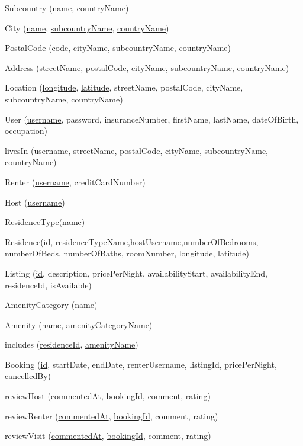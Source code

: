 \documentclass[11pt]{article}
\begin{document}
Subcountry (\underline{name}, \underline{countryName})

City (\underline{name}, \underline{subcountryName}, \underline{countryName})

PostalCode (\underline{code}, \underline{cityName}, \underline{subcountryName}, \underline{countryName})

Address (\underline{streetName}, \underline{postalCode}, \underline{cityName}, \underline{subcountryName}, \underline{countryName})

Location (\underline{longitude}, \underline{latitude}, streetName, postalCode, cityName, subcountryName, countryName)

User (\underline{username}, password, insuranceNumber, firstName, lastName, dateOfBirth, occupation)

livesIn (\underline{username}, streetName, postalCode, cityName, subcountryName, countryName)

Renter (\underline{username}, creditCardNumber)

Host (\underline{username})

ResidenceType(\underline{name})

Residence(\underline{id}, residenceTypeName,hostUsername,numberOfBedrooms, numberOfBeds, numberOfBaths, roomNumber, longitude, latitude)

Listing (\underline{id}, description, pricePerNight, availabilityStart, availabilityEnd, residenceId, isAvailable)

AmenityCategory (\underline{name})

Amenity (\underline{name}, amenityCategoryName)

includes (\underline{residenceId}, \underline{amenityName})

Booking (\underline{id}, startDate, endDate, renterUsername, listingId, pricePerNight, cancelledBy)

reviewHost (\underline{commentedAt}, \underline{bookingId}, comment, rating)

reviewRenter (\underline{commentedAt},  \underline{bookingId}, comment, rating)

reviewVisit (\underline{commentedAt}, \underline{bookingId}, comment, rating)
\end{document}
